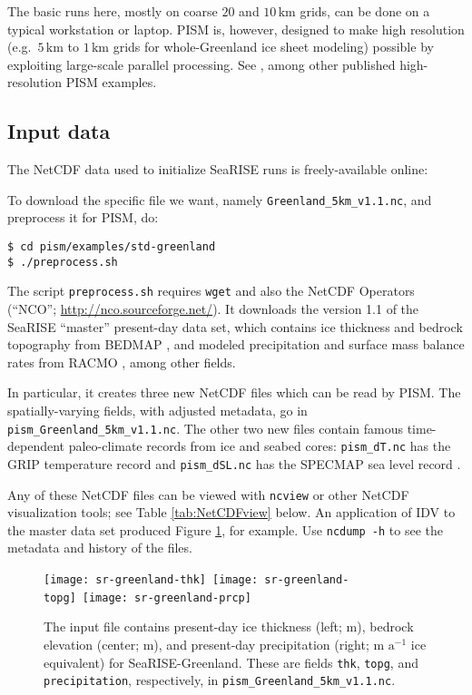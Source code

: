 The basic runs here, mostly on coarse $20$ and $10\,\textrm{km}$ grids, can be done on a typical workstation or laptop.  PISM is, however, designed to make high resolution (e.g.~$5\,\textrm{km}$ to $1\,\textrm{km}$ grids for whole-Greenland ice sheet modeling) possible by exploiting large-scale parallel processing.  See \cite{AschwandenAdalgeirsdottirKhroulev,Golledgeetal2012,Golledgeetal2013}, among other published high-resolution PISM examples.


\subsection{Input data}

The NetCDF data used to initialize SeaRISE runs is freely-available online: 
\medskip

\centerline{}
\medskip

\noindent To download the specific file we want, namely \texttt{Greenland_5km_v1.1.nc}, and preprocess it for PISM, do:
\begin{verbatim}
$ cd pism/examples/std-greenland
$ ./preprocess.sh
\end{verbatim}
\noindent The script \texttt{preprocess.sh} requires \texttt{wget} and also the NetCDF Operators (``NCO''; \url{http://nco.sourceforge.net/}).  It downloads the version 1.1 of the SeaRISE ``master'' present-day data set, which contains ice thickness and bedrock topography from BEDMAP \cite{BamberLayberryGogenini}, and modeled precipitation and surface mass balance rates from RACMO \cite{Ettemaetal2009}, among other fields.

In particular, it creates three new NetCDF files which can be read by PISM.  The spatially-varying fields, with adjusted metadata, go in \texttt{pism_Greenland_5km_v1.1.nc}.  The other two new files contain famous time-dependent paleo-climate records from ice and seabed cores: \texttt{pism_dT.nc} has the GRIP temperature record \cite{JohnsenetalGRIP} and \texttt{pism_dSL.nc} has the SPECMAP sea level record \cite{Imbrieetal1984}.

Any of these NetCDF files can be viewed with \texttt{ncview} or other NetCDF visualization tools; see Table \ref{tab:NetCDFview} below.  An application of IDV to the master data set produced Figure \ref{fig:sr-input}, for example.  Use \texttt{ncdump -h} to see the metadata and history of the files.

\begin{figure}[ht]
\centering
\mbox{\texttt{[image: sr-greenland-thk]}
  \qquad
  \texttt{[image: sr-greenland-topg]}
  \qquad
  \texttt{[image: sr-greenland-prcp]}}
\caption{The input file contains present-day ice thickness (left; m), bedrock elevation (center; m), and present-day precipitation (right; m $\text{a}^{-1}$ ice equivalent) for SeaRISE-Greenland.  These are fields \texttt{thk}, \texttt{topg}, and \texttt{precipitation}, respectively, in \texttt{pism_Greenland_5km_v1.1.nc}.}
\label{fig:sr-input}
\end{figure}


